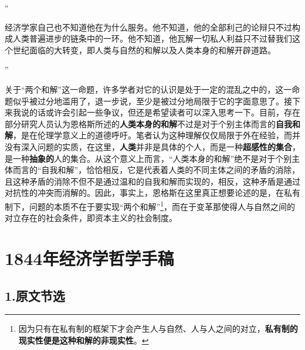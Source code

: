 \documentclass[a4paper,twoside,12pt]{ctexart}
\begin{document}
“\begin{fangsong}
经济学家自己也不知道他在为什么服务。他不知道，他的全部利己的论辩只不过构成人类普遍进步的链条中的一环。他不知道，他瓦解一切私人利益只不过替我们这个世纪面临的大转变，即人类与自然的和解以及人类本身的和解开辟道路。    
\end{fangsong}”

关于“两个和解”这一命题，许多学者对它的认识是处于一定的混乱之中的，这一命题似乎被过分地滥用了，退一步说，至少是被过分地局限于它的字面意思了。接下来我说的话或许会引起一些争议，但还是希望读者可以深入思考一下。目前，存在部分研究人员认为恩格斯所述的\textbf{人类本身的和解}不过是对于个别主体而言的\textbf{自我和解}，是在伦理学意义上的道德呼吁。笔者认为这种理解仅仅局限于外在经验，而并没有深入问题的实质，在这里，\textbf{人类}并非是具体的个人，而是一种\textbf{超感性的集合}，是一种\textbf{抽象的}人的集合。从这个意义上而言，“人类本身的和解”绝不是对于个别主体而言的“自我和解”，恰恰相反，它是代表着人类的不同主体之间的矛盾的消除，且这种矛盾的消除不但不是通过温和的自我和解而实现的，相反，这种矛盾是通过对抗性的冲突而消解的。因此，事实上，恩格斯在这里真正想要论述的是，在私有制下，问题的本质不在于要实现“两个和解”\footnote{因为只有在私有制的框架下才会产生人与自然、人与人之间的对立，\textbf{私有制的现实性便是这种和解的非现实性}。}，而在于变革那使得人与自然之间的对立存在的社会条件，即资本主义的社会制度。
\newpage
\section{1844年经济学哲学手稿}
\subsection{1.原文节选}
\end{document}
